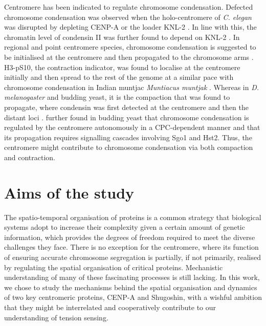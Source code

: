 Centromere has been indicated to regulate chromosome condensation. Defected chromosome condensation was observed when the holo-centromere of \textit{C. elegan} was disrupted by depleting CENP-A or the loader KNL-2 \citep{Chan2004CondensinDivisions, Maddox2006MolecularAssay, Hagstrom2002C.Meiosis, Maddox2007FunctionalChromatin}. In line with this, the chromatin level of condensin II was further found to depend on KNL-2 \citep{Wenda2021MitoticElegans}. In regional and point centromere species, chromosome condensation is suggested to be initialised at the centromere and then propagated to the chromosome arms \citep{Kruitwagen2018}. H3-pS10, the contraction indicator, was found to localise at the centromere initially and then spread to the rest of the genome at a similar pace with chromosome condensation in Indian muntjac \textit{Muntiacus muntjak} \citep{Hendzel1997Mitosis-specificCondensation}. Whereas in \textit{D. melanogaster} and budding yeast, it is the compaction that was found to propagate, where condensin was first detected at the centromere and then the distant loci \citep{Oliveira2007CondensinChromosomes, Leonard2015}. \cite{Kruitwagen2018} further found in budding yeast that chromosome condensation is regulated by the centromere autonomously in a CPC-dependent manner and that its propagation requires signalling cascades involving Sgo1 and Hst2. Thus, the centromere might contribute to chromosome condensation via both compaction and contraction. 

\section{Aims of the study}

The spatio-temporal organisation of proteins is a common strategy that biological systems adopt to increase their complexity given a certain amount of genetic information, which provides the degrees of freedom required to meet the diverse challenges they face. There is no exception for the centromere, where its function of ensuring accurate chromosome segregation is partially, if not primarily, realised by regulating the spatial organisation of critical proteins. Mechanistic understanding of many of these fascinating processes is still lacking. In this work, we chose to study the mechanisms behind the spatial organisation and dynamics of two key centromeric proteins, CENP-A and Shugoshin, with a wishful ambition that they might be interrelated and cooperatively contribute to our understanding of tension sensing. 

